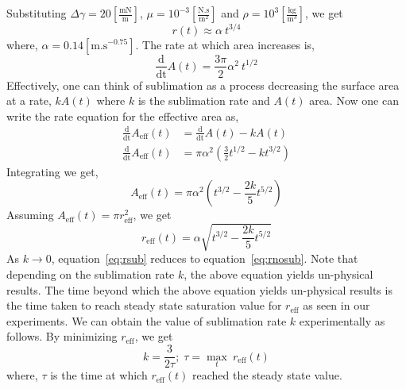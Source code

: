 \documentclass[12pt]{article}
\begin{document}
Substituting $\Delta \gamma = 20 \left[\mathrm{\frac{mN}{m}}\right]$, $\mu = 10^{-3} \left[\mathrm{\frac{N.s}{m^2}}\right]$ and $\rho = 10^3 \left[\mathrm{\frac{kg}{m^3}}\right]$, we get
\begin{equation*}
r(t) \approx \alpha \ t^{3/4}
\end{equation*}
where, $\alpha = 0.14 \left[\mathrm{m.s^{-0.75}}\right]$. The rate at which area increases is, 
\begin{equation*}
\frac{\mathrm{d}}{\mathrm{dt}}A(t) = \frac{3\pi}{2}\alpha^{2}\ t^{1/2}
\end{equation*}
Effectively, one can think of sublimation as a process decreasing the surface area at a rate, $kA(t)$ where $k$ is the sublimation rate and $A(t)$ area.
Now one can write the rate equation for the effective area as,
\begin{align*}
\frac{\mathrm{d}}{\mathrm{dt}}A_{\mathrm{eff}}(t) &= \frac{\mathrm{d}}{\mathrm{dt}}A(t) - kA(t) \\
\frac{\mathrm{d}}{\mathrm{dt}}A_{\mathrm{eff}}(t) &= \pi \alpha^{2}\left(\frac{3}{2}t^{1/2}-kt^{3/2}\right)
\end{align*}
Integrating we get,
\begin{equation*}
A_{\mathrm{eff}}(t) = \pi \alpha^{2}\left(t^{3/2}-\frac{2k}{5}t^{5/2}\right)
\end{equation*}
Assuming $A_{\mathrm{eff}}(t) = \pi r_{\mathrm{eff}}^{2}$, we get 
\begin{equation}\label{eq:rsub}
r_{\mathrm{eff}}(t) = \alpha \sqrt{t^{3/2}-\frac{2k}{5}t^{5/2}}
\end{equation}
As $k\to0$, equation~\ref{eq:rsub} reduces to equation~\ref{eq:rnosub}. Note that depending on the sublimation rate $k$, the above equation yields un-physical results. The time beyond which the above equation yields un-physical results is the time taken to reach steady state saturation value for $r_{\mathrm{eff}}$ as seen in our experiments. We can obtain the value of sublimation rate $k$ experimentally as follows. By minimizing $r_{\mathrm{eff}}$, we get
\begin{equation}
k = \frac{3}{2\tau}; \; \tau = \max_{t} \ r_{\mathrm{eff}}(t)
\end{equation}
where, $\tau$ is the time at which $r_{\mathrm{eff}}(t)$ reached the steady state value.
\end{document}
